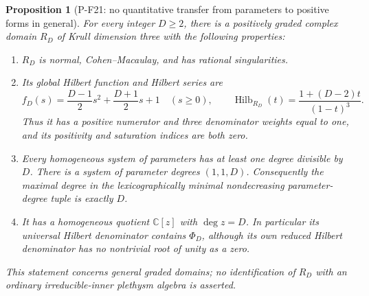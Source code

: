 \documentclass[11pt,a4paper]{article}
\newtheorem{proposition}{Proposition}[section]
\begin{document}
\begin{proposition}[P-F21: no quantitative transfer from parameters to positive forms in general]
\label{prop:toricperiodcollapse}
For every integer $D\ge2$, there is a positively graded complex domain
$R_D$ of Krull dimension three with the following properties:
\begin{enumerate}
\item $R_D$ is normal, Cohen--Macaulay, and has rational singularities.
\item Its global Hilbert function and Hilbert series are
\[
 f_D(s)=\frac{D-1}{2}s^2+\frac{D+1}{2}s+1\quad(s\ge0),
 \qquad
 \operatorname{Hilb}_{R_D}(t)=\frac{1+(D-2)t}{(1-t)^3}.
 \tag{P-F21a}
\]
Thus it has a positive numerator and three denominator weights equal to
one, and its positivity and saturation indices are both zero.
\item Every homogeneous system of parameters has at least one degree
divisible by $D$. There is a system of parameter degrees $(1,1,D)$.
Consequently the maximal degree in the lexicographically minimal
nondecreasing parameter-degree tuple is exactly $D$.
\item It has a homogeneous quotient $\mathbb C[z]$ with $\deg z=D$.
In particular its universal Hilbert denominator contains $\Phi_D$,
although its own reduced Hilbert denominator has no nontrivial root
of unity as a zero.
\end{enumerate}
This statement concerns general graded domains; no identification of
$R_D$ with an ordinary irreducible-inner plethysm algebra is asserted.
\end{proposition}
\end{document}
